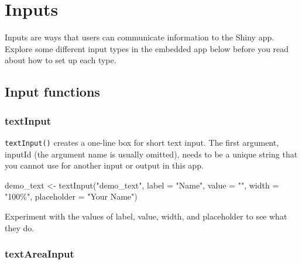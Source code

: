 \documentclass[
  oneside]{book}
\newenvironment{Shaded}{\begin{snugshade}}{\end{snugshade}}
\newcommand{\AttributeTok}[1]{\textcolor[rgb]{0.77,0.63,0.00}{#1}}
\newcommand{\FunctionTok}[1]{\textcolor[rgb]{0.00,0.00,0.00}{#1}}
\newcommand{\NormalTok}[1]{#1}
\newcommand{\OtherTok}[1]{\textcolor[rgb]{0.56,0.35,0.01}{#1}}
\newcommand{\StringTok}[1]{\textcolor[rgb]{0.31,0.60,0.02}{#1}}
\begin{document}
\hypertarget{inputs}{%
\chapter{Inputs}\label{inputs}}

Inputs are ways that users can communicate information to the Shiny app. Explore some different input types in the embedded app below before you read about how to set up each type.

\hypertarget{input-functions}{%
\section{Input functions}\label{input-functions}}

\hypertarget{textinput}{%
\subsection{textInput}\label{textinput}}

\texttt{textInput}\texttt{()} creates a one-line box for short text input. The first argument, \AttributeTok{inputId} (the argument name is usually omitted), needs to be a unique string that you cannot use for another input or output in this app.

\begin{Shaded}
\begin{Highlighting}[]
\NormalTok{demo\_text }\OtherTok{\textless{}{-}} 
  \FunctionTok{textInput}\NormalTok{(}\StringTok{"demo\_text"}\NormalTok{, }
            \AttributeTok{label =} \StringTok{"Name"}\NormalTok{, }
            \AttributeTok{value =} \StringTok{""}\NormalTok{, }
            \AttributeTok{width =} \StringTok{"100\%"}\NormalTok{,}
            \AttributeTok{placeholder =} \StringTok{"Your Name"}\NormalTok{)}
\end{Highlighting}
\end{Shaded}

\begin{try}
Experiment with the values of \AttributeTok{label}, \AttributeTok{value}, \AttributeTok{width}, and \AttributeTok{placeholder} to see what they do.

\end{try}

\hypertarget{textareainput}{%
\subsection{textAreaInput}\label{textareainput}}
\end{document}
